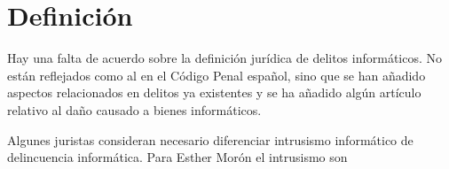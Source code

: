 
\section{Definición}

Hay una falta de acuerdo sobre la definición jurídica de delitos informáticos. No están reflejados como al en el Código Penal español, sino que se han añadido aspectos relacionados en delitos ya existentes y se ha añadido algún artículo relativo al daño causado a bienes informáticos.

Algunes juristas consideran necesario diferenciar intrusismo informático de delincuencia informática.
Para Esther Morón el intrusismo son %
